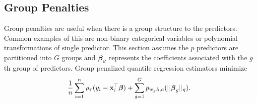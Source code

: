 \documentclass[article]{rqPenVignette}%
\newcommand{\vx}{{\bf x}}
\newcommand{\vbeta}{\mbox{\boldmath $\beta$}}
\begin{document}
\subsection{Group Penalties}

Group penalties are useful when there is a group structure to the predictors. Common examples of this are non-binary categorical variables or polynomial transformations of single predictor. This section assumes the $p$ predictors are partitioned into $G$ groups and $\vbeta_g$ represents the coefficients associated with the $g$th group of predictors. Group penalized quantile regression estimators minimize
\begin{equation}
\label{groupForm}
\frac{1}{n} \sum_{i=1}^n \rho_\tau(y_i - \vx_i^\top\vbeta) + \sum_{g=1}^G p_{w_g\lambda,a}(||\vbeta_g||_q).
\end{equation}
\end{document}
